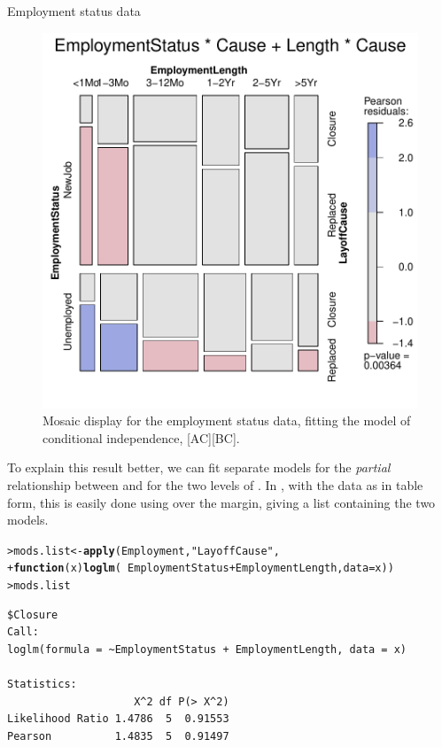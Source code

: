 \documentclass[10pt,krantz2]{krantz}\usepackage[]{graphicx}\usepackage[]{color}
\makeatletter
\newcommand{\hlstr}[1]{\textcolor[rgb]{0.192,0.494,0.8}{#1}}%
\newcommand{\hlopt}[1]{\textcolor[rgb]{0,0,0}{#1}}%
\newcommand{\hlstd}[1]{\textcolor[rgb]{0.345,0.345,0.345}{#1}}%
\newcommand{\hlkwa}[1]{\textcolor[rgb]{0.161,0.373,0.58}{\textbf{#1}}}%
\newcommand{\hlkwb}[1]{\textcolor[rgb]{0.69,0.353,0.396}{#1}}%
\newcommand{\hlkwc}[1]{\textcolor[rgb]{0.333,0.667,0.333}{#1}}%
\newcommand{\hlkwd}[1]{\textcolor[rgb]{0.737,0.353,0.396}{\textbf{#1}}}%
\newenvironment{kframe}{%
 \def\at@end@of@kframe{}%
 \ifinner\ifhmode%
  \def\at@end@of@kframe{\end{minipage}}%
  \begin{minipage}{\columnwidth}%
 \fi\fi%
 \def\FrameCommand##1{\hskip\@totalleftmargin \hskip-\fboxsep
 \colorbox{shadecolor}{##1}\hskip-\fboxsep
     \hskip-\linewidth \hskip-\@totalleftmargin \hskip\columnwidth}%
 \MakeFramed {\advance\hsize-\width
   \@totalleftmargin\z@ \linewidth\hsize
   \@setminipage}}%
 {\par\unskip\endMakeFramed%
 \at@end@of@kframe}
\newenvironment{knitrout}{}{} %
\renewenvironment{knitrout}{\small\renewcommand{\baselinestretch}{.85}}{} %
\makeatother
\begin{document}
\begin{Example}[employ]{Employment status data}
\begin{knitrout}
\begin{figure}[!htbp]
\centerline{\includegraphics[width=.6\textwidth]{ch05/fig/employ-mos2-1} }

\caption[Mosaic display for the employment status data, fitting the model of conditional independence]{Mosaic display for the employment status data, fitting the model of conditional independence, [AC][BC].\label{fig:employ-mos2}}
\end{figure}


\end{knitrout}

To explain this result better, we can fit separate models for the \emph{partial}
relationship between  and 
for the two levels of . In \R, with the  data
as in table form, this is easily done using  over the
 margin, giving a list containing the two  models.

\begin{knitrout}
\color{fgcolor}\begin{kframe}
\begin{alltt}
\hlstd{> }\hlstd{mods.list} \hlkwb{<-} \hlkwd{apply}\hlstd{(Employment,} \hlstr{"LayoffCause"}\hlstd{,}
\hlstd{+ }                   \hlkwa{function}\hlstd{(}\hlkwc{x}\hlstd{)} \hlkwd{loglm}\hlstd{(}\hlopt{~} \hlstd{EmploymentStatus} \hlopt{+} \hlstd{EmploymentLength,} \hlkwc{data} \hlstd{= x))}
\hlstd{> }\hlstd{mods.list}
\end{alltt}
\begin{verbatim}
$Closure
Call:
loglm(formula = ~EmploymentStatus + EmploymentLength, data = x)

Statistics:
                    X^2 df P(> X^2)
Likelihood Ratio 1.4786  5  0.91553
Pearson          1.4835  5  0.91497


\end{verbatim}
\end{kframe}
\end{knitrout}
\end{Example}
\end{document}
